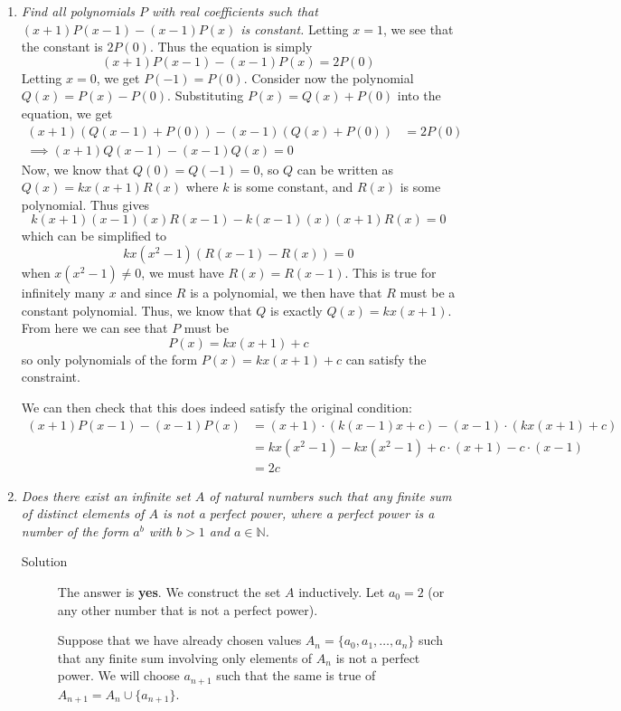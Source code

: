 \documentclass{article}
\begin{document}
\begin{enumerate}[1.]
\item %
{\itshape Find all polynomials $P$ with real coefficients such that $(x + 1)P(x - 1) - (x - 1)P(x)$ is constant.}
Letting $x = 1$, we see that the constant is $2P(0)$. Thus the equation is simply
$$(x + 1)P(x - 1) - (x - 1)P(x) = 2P(0) $$
Letting $x = 0$, we get $P(-1) = P(0)$. Consider now the polynomial $Q(x) = P(x) - P(0)$. Substituting $P(x) = Q(x) + P(0)$ into the equation, we get
\begin{align*}
  (x + 1)(Q(x - 1) + P(0)) - (x - 1)(Q(x) + P(0)) &= 2P(0) \\
  \implies (x + 1)Q(x - 1) - (x - 1)Q(x) = 0
\end{align*}
Now, we know that $Q(0) = Q(-1) = 0$, so $Q$ can be written as $Q(x) = kx(x + 1)R(x)$ where $k$ is some constant, and $R(x)$ is some polynomial. Thus gives 
$$k(x + 1)(x - 1)(x)R(x - 1) - k(x - 1)(x)(x + 1)R(x) = 0 $$
which can be simplified to
$$kx(x^2 - 1)(R(x - 1) - R(x)) = 0$$
when $x(x^2 - 1) \ne 0$, we must have $R(x) = R(x - 1)$. This is true for infinitely many $x$ and since $R$ is a polynomial, we then have that $R$ must be a constant polynomial. Thus, we know that $Q$ is exactly $Q(x) = kx(x + 1)$. From here we can see that $P$ must be
$$P(x) = kx(x + 1) + c$$
so only polynomials of the form $P(x) = kx(x + 1) + c$ can satisfy the constraint.

We can then check that this does indeed satisfy the original condition:
\begin{align*}
  (x + 1)P(x - 1) - (x - 1)P(x) &= (x + 1) \cdot (k(x - 1)x + c) - (x - 1) \cdot (kx(x + 1) + c) \\
  &= kx(x^2 - 1) - kx(x^2 - 1) + c \cdot (x + 1) - c \cdot (x - 1) \\
  &= 2c
\end{align*}

\item %
{\itshape Does there exist an infinite set $A$ of natural numbers such that any finite sum of distinct elements of $A$ is not a perfect power, where a perfect power is a number of the form $a^b$ with $b > 1$ and $a \in \mathbb{N}$.}

\begin{description}
  \item[Solution]
    The answer is \textbf{yes}. We construct the set $A$ inductively. Let $a_0 = 2$ (or any other number that is not a perfect power).

    Suppose that we have already chosen values $A_n = \{a_0, a_1, \dots, a_n\}$ such that any finite sum involving only elements of $A_n$ is not a perfect power. We will choose $a_{n + 1}$ such that the same is true of $A_{n + 1} = A_n \cup \{ a_{n + 1} \}$.


\end{description}
\end{enumerate}
\end{document}
